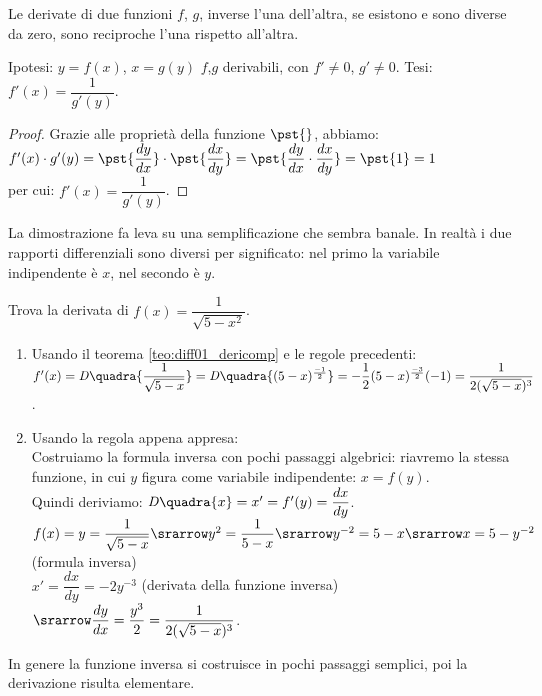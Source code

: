 \begin{teorema}
 Le derivate di due funzioni $f$, $g$, inverse l'una dell'altra, se esistono
 e sono diverse da zero, sono reciproche l'una rispetto all'altra.
\end{teorema}
\noindent Ipotesi: $y=f(x)$, $x=g(y)$ $f$,$g$ derivabili, con $f'\ne0$, $g'\ne 0$.
\hspace{2cm} Tesi: $f'(x)=\dfrac{1}{g'(y)}$.
\begin{proof}
  Grazie alle proprietà della funzione $\pst{}$, abbiamo:\\
  $f'(x)\cdot g'(y)=\pst{\dfrac{dy}{dx}}\cdot\pst{\dfrac{dx}{dy}}=
  \pst{\dfrac{dy}{dx}\cdot\dfrac{dx}{dy}}=\pst{1}=1$\\
  per cui: $f'(x)=\dfrac{1}{g'(y)}$.
\end{proof}
\begin{osservazione}
 La dimostrazione fa leva su una semplificazione che sembra banale. In realtà
 i due rapporti differenziali sono diversi per significato: nel primo la 
 variabile indipendente è $x$, nel secondo è $y$.
\end{osservazione}
\begin{esempio}
  Trova la derivata di $f(x)=\dfrac{1}{\sqrt{5-x^2}}$.
  \begin{enumerate}[noitemsep]
   \item Usando il teorema \ref{teo:diff01_dericomp} e le regole precedenti:\\
   $f'(x)=\mathit{D}\quadra{\dfrac{1}{\sqrt{5-x}}}=
   \mathit{D}\quadra{(5-x)^\frac{-1}{2}}=-\dfrac{1}{2}(5-x)
   ^\frac{-3}{2}(-1) = \dfrac{1}{2(\sqrt{5-x})^3}$.
   \item Usando la regola appena appresa:\\
   Costruiamo la formula inversa con pochi passaggi algebrici: riavremo la 
   stessa funzione, in cui $y$ figura come variabile indipendente: $x=f(y)$.\\
   Quindi deriviamo: $\mathit{D}\quadra{x}=x'=f'(y)=\dfrac{dx}{dy}$.\\
   $f(x)=y=\dfrac{1}{\sqrt{5-x}}\srarrow y^2=\dfrac{1}{5-x}\srarrow 
   y^{-2}=5-x\srarrow x=5-y^{-2}$  (formula inversa)\\
   $x'=\dfrac{dx}{dy}=-2y^{-3}$ (derivata della funzione inversa)
   $\srarrow \dfrac{dy}{dx}=\dfrac{y^3}{2}=
   \dfrac{1}{2(\sqrt{5-x})^3}$.
  \end{enumerate}
In genere la funzione inversa si costruisce in pochi passaggi semplici, poi 
la derivazione risulta elementare.
\end{esempio}



